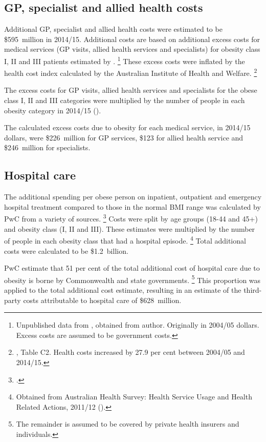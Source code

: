 \documentclass[embargoed]{grattan}
\begin{document}
\subsection{GP, specialist and allied health costs}\label{gp-specialists-and-allied-health-costs}

Additional GP, specialist and allied health costs were estimated to be \$595~million in 2014/15.
Additional costs are based on additional excess costs for medical services (GP visits, allied health services and specialists) for obesity class I, II and III patients estimated by \textcite{Colagiuri2010costoverweightobesity}.%
\footnote{Unpublished data from \textcite{Colagiuri2010costoverweightobesity}, obtained from author.
Originally in 2004/05 dollars.
Excess costs are assumed to be government costs.}
These excess costs were inflated by the health cost index calculated by the Australian Institute of Health and Welfare.%
\footnote{\textcite{Health2015HealthexpenditureAustralia}, Table C2. Health costs increased by 27.9 per cent between 2004/05 and 2014/15.}

The excess costs for GP visits, allied health services and specialists for the obese class I, II and III categories were multiplied by the number of people in each obesity category in 2014/15 ().

The calculated excess costs due to obesity for each medical service, in 2014/15 dollars, were \$226~million for GP services, \$123 for allied health service and \$246~million for specialists.

\subsection{Hospital care }\label{hospital-care}

The additional spending per obese person on inpatient, outpatient and emergency hospital treatment compared to those in the normal BMI range was calculated by PwC from a variety of sources.%
\footcite[][48]{PwC2015Weighingcostobesity} Costs were split by age groups (18-44 and 45+) and obesity class (I, II and III).
These estimates were multiplied by the number of people in each obesity class that had a hospital episode.%
\footnote{Obtained from Australian Health Survey: Health Service Usage and Health Related Actions, 2011/12 (\textcite{ABS20134364055002AustralianHealth}).} Total additional costs were calculated to be \$1.2~billion.

PwC estimate that 51 per cent of the total additional cost of hospital care due to obesity is borne by Commonwealth and state governments.%
\footnote{The remainder is assumed to be covered by private health insurers and individuals.} This proportion was applied to the total additional cost estimate, resulting in an estimate of the third-party costs attributable to hospital care of \$628~million.
\end{document}
